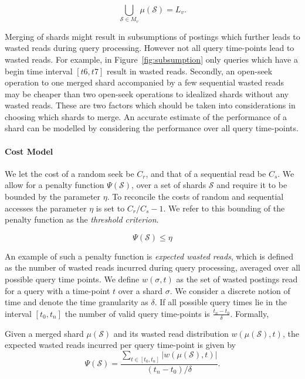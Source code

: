 $$
	\bigcup_{\mathcal{S} \in M_v}{\mu(\mathcal{S})} = L_v.
$$

Merging of shards might result in subsumptions of postings which further leads to wasted reads during query processing. However not all query time-points lead to wasted reads. For example, in Figure~\ref{fig:subsumption} only queries which have a begin time interval $[t6, t7]$ result in wasted reads. Secondly, an open-seek operation to one merged shard accompanied by a few
sequential wasted reads may be cheaper than two open-seek operations to
idealized shards without any wasted reads. These are two factors which should be taken into considerations in choosing which shards to merge. An accurate estimate of the performance of a shard can be modelled by considering the performance over all query time-points.

\paragraph{Cost Model} We let the cost of a random seek be $C_r$, and that of a sequential read be $C_s$. 
We allow for a penalty function $\Psi(\mathcal{S})$, over a set of shards $\mathcal{S}$ and require it to be bounded by the parameter $\eta$. To reconcile the costs of random and sequential accesses the parameter $\eta$ is set to $C_r/C_s - 1$. We refer to this bounding of the penalty function as the \emph{threshold criterion}.

$$\Psi(\mathcal{S}) \leq \eta$$

An example of such a penalty function is \emph{expected wasted reads},
which is defined as the number of wasted reads incurred during query
processing, averaged over all possible query time points. 
We define $w(\sigma, t)$ as the set of wasted postings read for a query with a time-point $t$ over a shard $\sigma$. We consider a discrete notion of time and denote the time granularity as $\delta$. If all possible query times lie in the interval $[t_{0}, t_{n}]$ the number of valid query time-points is $\frac{t_{n} - t_{0}}{\delta}$. Formally, 

\begin{definition}
	Given a merged shard $\mu(\mathcal{S})$ and its wasted read distribution $w(\mu(\mathcal{S}), t)$, the expected wasted reads incurred per query time-point is given by
		$$
			\Psi(\mathcal{S}) = \frac{\sum_{t \in [t_{0}, t_{n}]}{|w(\mu(\mathcal{S}), t)|}}{(t_{n} - t_{0})/ \delta}.
		$$
\end{definition}

